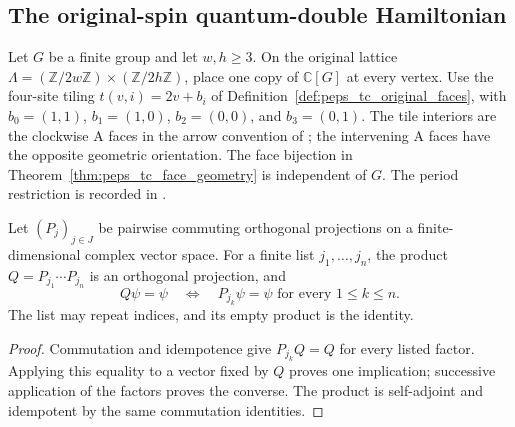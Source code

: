 \subsection{The original-spin quantum-double Hamiltonian}
\label{sec:peps_qd_original_spins}

Let $G$ be a finite group and let $w,h\ge3$.
On the original lattice
$\Lambda=(\mathbb Z/2w\mathbb Z)\times(\mathbb Z/2h\mathbb Z)$,
place one copy of $\mathbb C[G]$ at every vertex.
Use the four-site tiling $t(v,i)=2v+b_i$ of
Definition~\ref{def:peps_tc_original_faces}, with
$b_0=(1,1)$, $b_1=(1,0)$, $b_2=(0,0)$, and $b_3=(0,1)$.
The tile interiors are the clockwise A faces in the arrow convention of
\cite[Section~7.2]{Schuch2010PEPS}; the intervening A faces have the
opposite geometric orientation. The face bijection in
Theorem~\ref{thm:peps_tc_face_geometry} is independent of $G$.
The period restriction is recorded in
\cite{gap:rmp_peps_examples_small_torus}.

\begin{lemma}
    \label{lem:peps_qd_commuting_projection_product}
    Let $(P_j)_{j\in J}$ be pairwise commuting orthogonal projections on a
    finite-dimensional complex vector space. For a finite list
    $j_1,\ldots,j_n$, the product $Q=P_{j_1}\cdots P_{j_n}$ is an
    orthogonal projection, and
    \[
        Q\psi=\psi\quad\Longleftrightarrow\quad
        P_{j_k}\psi=\psi\text{ for every }1\le k\le n.
    \]
    The list may repeat indices, and its empty product is the identity.
\end{lemma}
\begin{proof}
    Commutation and idempotence give $P_{j_k}Q=Q$ for every listed factor.
    Applying this equality to a vector fixed by $Q$ proves one implication;
    successive application of the factors proves the converse.
    The product is self-adjoint and idempotent by the same commutation identities.
\end{proof}

